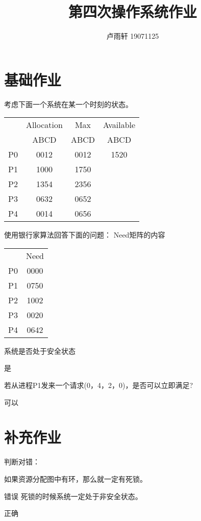 \documentclass{ctexart}
\title{第四次操作系统作业}
\author{卢雨轩 19071125}
\begin{document}
\maketitle

\section*{基础作业}

\begin{outline}[enumerate]
    \1 考虑下面一个系统在某一个时刻的状态。
    \begin{center}
        \begin{tabular}{c c c c}
            & Allocation & Max & Available \\
            & ABCD & ABCD & ABCD \\
            P0 & 0012 & 0012 & 1520 \\
            P1 & 1000 & 1750 \\
            P2 & 1354 & 2356 \\
            P3 & 0632 & 0652 \\
            P4 & 0014 & 0656 \\
        \end{tabular}
    \end{center}
        使用银行家算法回答下面的问题：
        \2 Need矩阵的内容
            \begin{center}
                \begin{tabular}{c c}
                    & Need \\
                    P0 & 0000 \\
                    P1 & 0750 \\
                    P2 & 1002 \\
                    P3 & 0020 \\
                    P4 & 0642 \\
                \end{tabular}
            \end{center}
        \2 系统是否处于安全状态
            
            是
        
        \2 若从进程P1发来一个请求(0，4，2，0)，是否可以立即满足?

            可以


\end{outline}

\section*{补充作业}
判断对错：
\begin{outline}
    \1 如果资源分配图中有环，那么就一定有死锁。 

        错误
    \1 死锁的时候系统一定处于非安全状态。
    
        正确
\end{outline}
\end{document}
